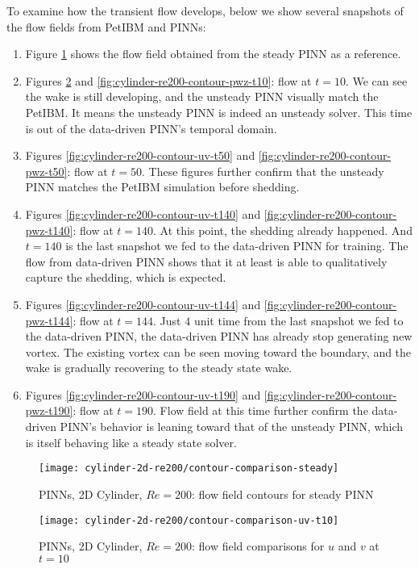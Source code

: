 To examine how the transient flow develops, below we show several snapshots of the flow fields from PetIBM and PINNs:
\begin{enumerate}
    \item Figure \ref{fig:cylinder-re200-contour-steady} shows the flow field obtained from the steady PINN as a reference.
    \item Figures \ref{fig:cylinder-re200-contour-uv-t10} and \ref{fig:cylinder-re200-contour-pwz-t10}: flow at $t=10$. We can see the wake is still developing, and the unsteady PINN visually match the PetIBM. It means the unsteady PINN is indeed an unsteady solver. This time is out of the data-driven PINN's temporal domain.
    \item Figures \ref{fig:cylinder-re200-contour-uv-t50} and \ref{fig:cylinder-re200-contour-pwz-t50}: flow at $t=50$. These figures further confirm that the unsteady PINN matches the PetIBM simulation before shedding.
    \item Figures \ref{fig:cylinder-re200-contour-uv-t140} and \ref{fig:cylinder-re200-contour-pwz-t140}: flow at $t=140$. At this point, the shedding already happened. And $t=140$ is the last snapshot we fed to the data-driven PINN for training. The flow from data-driven PINN shows that it at least is able to qualitatively capture the shedding, which is expected.
    \item Figures \ref{fig:cylinder-re200-contour-uv-t144} and \ref{fig:cylinder-re200-contour-pwz-t144}: flow at $t=144$. Just $4$ unit time from the last snapshot we fed to the data-driven PINN, the data-driven PINN has already stop generating new vortex. The existing vortex can be seen moving toward the boundary, and the wake is gradually recovering to the steady state wake.
    \item Figures \ref{fig:cylinder-re200-contour-uv-t190} and \ref{fig:cylinder-re200-contour-pwz-t190}: flow at $t=190$. Flow field at this time further confirm the data-driven PINN's behavior is leaning toward that of the unsteady PINN, which is itself behaving like a steady state solver.
\end{enumerate}

\begin{figure}[hbt!]
    \texttt{[image: cylinder-2d-re200/contour-comparison-steady]}
    \caption{PINNs, 2D Cylinder, $Re=200$: flow field contours for steady PINN}
    \label{fig:cylinder-re200-contour-steady}
\end{figure}

\begin{figure}[hbt!]
    \texttt{[image: cylinder-2d-re200/contour-comparison-uv-t10]}
    \caption{PINNs, 2D Cylinder, $Re=200$: flow field comparisons for $u$ and $v$ at $t=10$}
    \label{fig:cylinder-re200-contour-uv-t10}
\end{figure}

